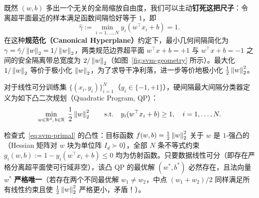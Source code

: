 既然 $(w, b)$ 多出一个无关的全局缩放自由度，我们可以主动\textbf{钉死这把尺子}：令离超平面最近的样本满足函数间隔恰好等于 $1$，即
\[
  \hat{\gamma} := \min_{i=1,\dots,N} y_i(w^\top x_i + b) = 1.
\]
在这种\textbf{规范化（Canonical Hyperplane）}约定下，最小几何间隔简化为 $\gamma = \hat{\gamma}/\left\|w\right\|_2 = 1/\left\|w\right\|_2$，两类规范边界超平面 $w^\top x + b = +1$ 与 $w^\top x + b = -1$ 之间的安全隔离带总宽度为 $2/\left\|w\right\|_2$（如图~\ref{fig:svm-geometry} 所示）。最大化 $1/\left\|w\right\|_2$ 等价于极小化 $\left\|w\right\|_2$，为了求导干净利落，进一步等价地极小化 $\frac{1}{2}\left\|w\right\|_2^2$。

\begin{defBox}
\begin{definition}\label{def:svm-primal}
对于线性可分训练集 $\{(x_i, y_i)\}_{i=1}^{N}$（$y_i \in \{-1, +1\}$），硬间隔最大间隔分类器定义为如下凸二次规划（Quadratic Program, QP）：
\begin{equation}\label{eq:svm-primal}
  \min_{w \in \mathbb{R}^d,\, b \in \mathbb{R}}\; \frac{1}{2}\left\|w\right\|_2^2
  \qquad \text{s.t.}\quad y_i(w^\top x_i + b) \ge 1, \quad i = 1, \dots, N.
\end{equation}
\end{definition}
\end{defBox}

检查式~\eqref{eq:svm-primal} 的凸性：目标函数 $f(w, b) = \frac{1}{2}\left\|w\right\|_2^2$ 关于 $w$ 是 $1$-强凸的（Hessian 矩阵对 $w$ 块为单位阵 $I_d \succ 0$），全部 $N$ 条不等式约束 $g_i(w, b) := 1 - y_i(w^\top x_i + b) \le 0$ 均为仿射函数。只要数据线性可分（即存在严格分离超平面使可行域非空），该凸 QP 的最优解 $(w^*, b^*)$ 必然存在，且法向量 $w^*$ \textbf{严格唯一}（若存在两个不同最优解 $w_1 \neq w_2$，中点 $(w_1+w_2)/2$ 同样满足所有线性约束且使 $\frac{1}{2}\left\|w\right\|_2^2$ 严格更小，矛盾！）。

